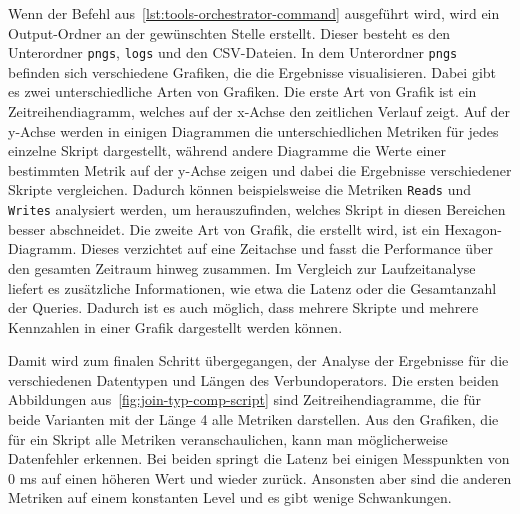 Wenn der Befehl aus~\ref{lst:tools-orchestrator-command} ausgeführt wird, wird ein Output-Ordner an der gewünschten Stelle erstellt.
Dieser besteht es den Unterordner \texttt{pngs}, \texttt{logs} und den CSV-Dateien.
In dem Unterordner \texttt{pngs} befinden sich verschiedene Grafiken, die die Ergebnisse visualisieren.
Dabei gibt es zwei unterschiedliche Arten von Grafiken.
Die erste Art von Grafik ist ein Zeitreihendiagramm, welches auf der x-Achse den zeitlichen Verlauf zeigt.
Auf der y-Achse werden in einigen Diagrammen die unterschiedlichen Metriken für jedes einzelne Skript dargestellt, während andere Diagramme die Werte einer bestimmten Metrik auf der y-Achse zeigen und dabei die Ergebnisse verschiedener Skripte vergleichen.
Dadurch können beispielsweise die Metriken \texttt{Reads} und \texttt{Writes} analysiert werden, um herauszufinden, welches Skript in diesen Bereichen besser abschneidet.
Die zweite Art von Grafik, die erstellt wird, ist ein Hexagon-Diagramm.
Dieses verzichtet auf eine Zeitachse und fasst die Performance über den gesamten Zeitraum hinweg zusammen.
Im Vergleich zur Laufzeitanalyse liefert es zusätzliche Informationen, wie etwa die Latenz oder die Gesamtanzahl der Queries.
Dadurch ist es auch möglich, dass mehrere Skripte und mehrere Kennzahlen in einer Grafik dargestellt werden können.

Damit wird zum finalen Schritt übergegangen, der Analyse der Ergebnisse für die verschiedenen Datentypen und Längen des Verbundoperators.
Die ersten beiden Abbildungen aus~\ref{fig:join-typ-comp-script} sind Zeitreihendiagramme, die für beide Varianten mit der Länge 4 alle Metriken darstellen.
Aus den Grafiken, die für ein Skript alle Metriken veranschaulichen, kann man möglicherweise Datenfehler erkennen.
Bei beiden springt die Latenz bei einigen Messpunkten von 0 ms auf einen höheren Wert und wieder zurück.
Ansonsten aber sind die anderen Metriken auf einem konstanten Level und es gibt wenige Schwankungen.

